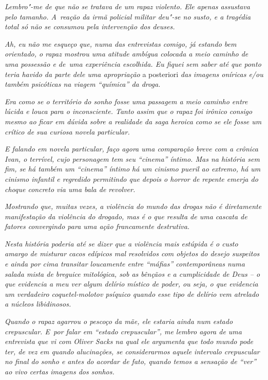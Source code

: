 \emph{Lembro"-me de que não se tratava de um rapaz violento. Ele apenas
assustava pelo tamanho. A~reação da irmã policial militar deu"-se no
susto, e a tragédia total só não se consumou pela intervenção dos
deuses.}

\emph{Ah, eu não me esqueço que, numa das entrevistas comigo, já estando
bem orientado, o rapaz mostrou uma atitude ambígua colocada a meio
caminho de uma possessão e de~uma experiência escolhida. Eu fiquei sem
saber até que ponto teria havido da parte dele uma apropriação} a
posteriori \emph{das imagens oníricas e/ou também psicóticas na viagem
``química'' da droga.}

\emph{Era como se o território do sonho fosse uma passagem a meio
caminho entre lúcida e louca para o inconsciente. Tanto assim que o
rapaz foi irônico consigo mesmo ao ficar em dúvida sobre a realidade da
saga heroica como se ele fosse um crítico de sua curiosa novela
particular.}

\emph{E falando em novela particular, faço agora uma comparação breve
com a crônica Ivan, o terrível, cujo personagem tem seu ``cinema''
íntimo. Mas na história sem fim, se há também um ``cinema'' íntimo há um
cinismo pueril ao extremo, há um cinismo infantil e regredido permitindo
que depois o horror de repente emerja do choque concreto via uma bala de
revolver.}

\emph{Mostrando que, muitas vezes, a violência do mundo das drogas não é
diretamente manifestação da violência do drogado, mas é o que resulta de
uma cascata de fatores convergindo para uma ação francamente
destrutiva.}

\emph{Nesta história poderia até se dizer que a violência mais estúpida é
o custo amargo de misturar cacos edípicos mal resolvidos com objetos do
desejo suspeitos e ainda por cima transitar loucamente entre ``máfias''
contemporâneas numa salada mista de breguice mitológica, sob as bênçãos
e a cumplicidade de Deus -- o que evidencia a meu ver algum delírio
místico de poder, ou seja, o que evidencia um verdadeiro coquetel-molotov 
psíquico quando esse tipo de delírio vem atrelado a núcleos
libidinosos.}

\emph{Quando o rapaz agarrou o pescoço da mãe, ele estaria ainda num
estado crepuscular. E~por falar em ``estado crepuscular'', me lembro
agora de uma entrevista que vi com Oliver Sacks na qual ele argumenta
que todo mundo pode ter, de vez em quando alucinações, se considerarmos
aquele intervalo crepuscular no final do sonho e antes do acordar de
fato, quando temos a sensação de ``ver'' ao vivo certas imagens dos
sonhos.}

